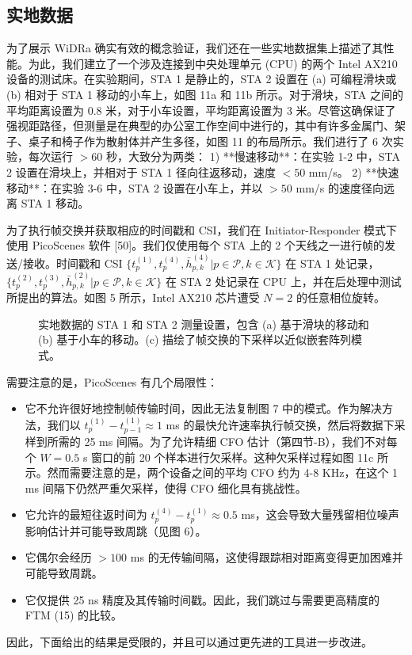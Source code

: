 \documentclass[journal]{IEEEtran}
\begin{document}
\subsection{实地数据}
为了展示 WiDRa 确实有效的概念验证，我们还在一些实地数据集上描述了其性能。为此，我们建立了一个涉及连接到中央处理单元 (CPU) 的两个 Intel AX210 设备的测试床。在实验期间，STA 1 是静止的，STA 2 设置在 (a) 可编程滑块或 (b) 相对于 STA 1 移动的小车上，如图 11a 和 11b 所示。对于滑块，STA 之间的平均距离设置为 0.8 米，对于小车设置，平均距离设置为 3 米。尽管这确保证了强视距路径，但测量是在典型的办公室工作空间中进行的，其中有许多金属门、架子、桌子和椅子作为散射体并产生多径，如图 11 的布局所示。我们进行了 6 次实验，每次运行 $>60$ 秒，大致分为两类：
1) **慢速移动**：在实验 1-2 中，STA 2 设置在滑块上，并相对于 STA 1 径向往返移动，速度 $<50$ mm/s。
2) **快速移动**：在实验 3-6 中，STA 2 设置在小车上，并以 $>50$ mm/s 的速度径向远离 STA 1 移动。

为了执行帧交换并获取相应的时间戳和 CSI，我们在 Initiator-Responder 模式下使用 PicoScenes 软件 [50]。我们仅使用每个 STA 上的 2 个天线之一进行帧的发送/接收。时间戳和 CSI $\{t_p^{(1)}, t_p^{(4)}, \bar{h}_{p,k}^{(4)} | p \in \mathcal{P}, k \in \mathcal{K}\}$ 在 STA 1 处记录，$\{t_p^{(2)}, t_p^{(3)}, \bar{h}_{p,k}^{(2)} | p \in \mathcal{P}, k \in \mathcal{K}\}$ 在 STA 2 处记录在 CPU 上，并在后处理中测试所提出的算法。如图 5 所示，Intel AX210 芯片遭受 $N=2$ 的任意相位旋转。

\begin{figure}[htbp]
\centering
{}
\caption{实地数据的 STA 1 和 STA 2 测量设置，包含 (a) 基于滑块的移动和 (b) 基于小车的移动。(c) 描绘了帧交换的下采样以近似嵌套阵列模式。}
\label{fig:fig11}
\end{figure}

需要注意的是，PicoScenes 有几个局限性：
\begin{itemize}
    \item 它不允许很好地控制帧传输时间，因此无法复制图 7 中的模式。作为解决方法，我们以 $t_p^{(1)} - t_{p-1}^{(1)} \approx 1$ ms 的最快允许速率执行帧交换，然后将数据下采样到所需的 25 ms 间隔。为了允许精细 CFO 估计（第四节-B），我们不对每个 $W=0.5$ s 窗口的前 20 个样本进行欠采样。这种欠采样过程如图 11c 所示。然而需要注意的是，两个设备之间的平均 CFO 约为 4-8 KHz，在这个 1 ms 间隔下仍然严重欠采样，使得 CFO 细化具有挑战性。
    \item 它允许的最短往返时间为 $t_p^{(4)} - t_p^{(1)} \approx 0.5$ ms，这会导致大量残留相位噪声影响估计并可能导致周跳（见图 6）。
    \item 它偶尔会经历 $>100$ ms 的无传输间隔，这使得跟踪相对距离变得更加困难并可能导致周跳。
    \item 它仅提供 25 ns 精度及其传输时间戳。因此，我们跳过与需要更高精度的 FTM (15) 的比较。
\end{itemize}
因此，下面给出的结果是受限的，并且可以通过更先进的工具进一步改进。
\end{document}
